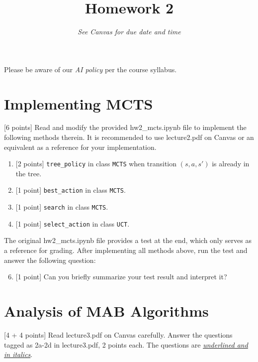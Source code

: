 \title{Homework 2}
\date{{\em See Canvas for due date and time}}

    

Please be aware of our {\em AI policy} per the course syllabus.

\section{Implementing MCTS}
{[6 points]}  Read and modify the provided hw2\_mcts.ipynb file to implement the following methods therein.
It is recommended to use lecture2.pdf on Canvas or an equivalent as a reference for your implementation.
\begin{enumerate}[label=(\alph*)]
\item {[2 points]} \texttt{tree\_policy} in class \texttt{MCTS} when transition $(s,a,s')$ is already in the tree.
\item {[1 point]} \texttt{best\_action} in class \texttt{MCTS}.
\item {[1 point]} \texttt{search} in class \texttt{MCTS}.
\item {[1 point]} \texttt{select\_action} in class \texttt{UCT}.
\end{enumerate}
The original hw2\_mcts.ipynb file provides a test at the end, which only serves as a reference for grading.
After implementing all methods above, run the test and answer the following question:
\begin{enumerate}[label=(\alph*)]
\setcounter{enumi}{5}
\item {[1 point]} Can you briefly summarize your test result and interpret it?
\end{enumerate}

\section{Analysis of MAB Algorithms}
{[4 + 4 points]} Read lecture3.pdf on Canvas carefully.
Answer the questions tagged as 2a-2d in lecture3.pdf, 2 points each.
The questions are \ul{\em underlined and in italics}.

